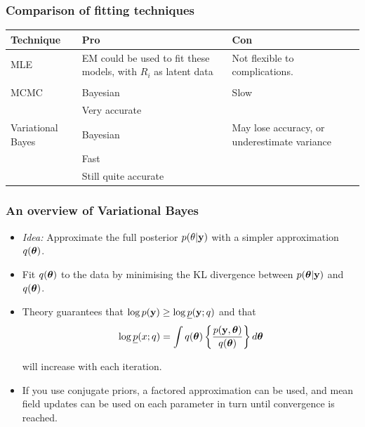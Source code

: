 \documentclass{beamer}
\begin{document}
\begin{frame}
	\frametitle{Comparison of fitting techniques}
	\begin{tabular}{p{2cm}p{3.5cm}p{4.5cm}}
		Technique         & Pro                                                             & Con                                          \\
		\hline
		MLE               & EM could be used to fit these models, with $R_i$ as latent data & Not flexible to complications.               \\
		                  &                                                                 &                                              \\ %
		\hline
		MCMC              & Bayesian                                                        & Slow                                         \\
		                  & Very accurate                                                   &                                              \\
		\hline
		Variational Bayes & Bayesian                                                        & May lose accuracy, or underestimate variance \\
		                  & Fast                                                            &                                              \\ %
		                  & Still quite accurate                                            &                                              \\
		\hline
	\end{tabular}
			
\end{frame}

\begin{frame}
	\frametitle{An overview of Variational Bayes}
	\begin{itemize}
		\item \emph{Idea:} Approximate the full posterior $p(\theta|{\bf y})$ with a simpler approximation $q({\boldsymbol \theta})$.
		      		      		      
		\item Fit $q({\boldsymbol \theta})$ to the data by minimising the KL divergence between $p({\boldsymbol \theta}|{\bf y})$ and $q({\boldsymbol \theta})$.
		      		      		      
		\item Theory guarantees that $\log p({\bf y})\ge 
		      \log \underline{p}({\bf y};q)$ and that 
		      $$
		      \log \underline{p}(x;q) = \int q({\boldsymbol \theta}) \left\{ \frac{p({\bf y},{\boldsymbol \theta})}{q({\boldsymbol \theta})} \right\} d {\boldsymbol \theta}
		      $$ 
		      		      		      
		      \noindent will
		      increase with each iteration.
		      		      		      
		\item If you use conjugate priors, a factored approximation can be used, and mean field updates can be used on
		      each parameter in turn until convergence is reached.
	\end{itemize}
\end{frame}
\end{document}
